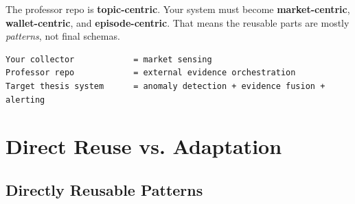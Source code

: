 \documentclass[11pt, letterpaper]{article}
\begin{document}
The professor repo is \textbf{topic-centric}. Your system must become \textbf{market-centric}, \textbf{wallet-centric}, and \textbf{episode-centric}. That means the reusable parts are mostly \emph{patterns}, not final schemas.

\begin{lstlisting}[title={Mental Model}]
Your collector            = market sensing
Professor repo            = external evidence orchestration
Target thesis system      = anomaly detection + evidence fusion + alerting
\end{lstlisting}

\section{Direct Reuse vs. Adaptation}

\subsection{Directly Reusable Patterns}
\end{document}
